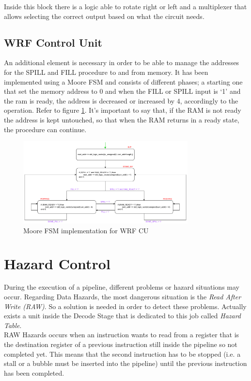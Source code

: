Inside this block there is a logic able to rotate right or left and a multiplexer that allows selecting the correct output based on what the circuit needs. 

\subsection{WRF Control Unit}

An additional element is necessary in order to be able to manage the addresses for the SPILL and FILL procedure to and from memory. It has been implemented using a Moore FSM and consists of different phases; a starting one that set the memory address to 0 and when the FILL or SPILL input is `1' and the ram is ready, the address is decreased or increased by 4, accordingly to the operation. Refer to figure \ref{wrf_cu}. It's important to say that, if the RAM is not ready the address is kept untouched, so that when the RAM returns in a ready state, the procedure can continue.


\begin{figure}[ht]
	\centering
	\includegraphics[width=0.8\textwidth]{chapters/4_DecodeStage/images/wRF_CU.pdf}
	\caption{Moore FSM implementation for WRF CU}
	\label{wrf_cu}
\end{figure}

\section{Hazard Control}

During the execution of a pipeline, different problems or hazard situations may occur. Regarding Data Hazards, the most dangerous situation is the \emph{Read After Write (RAW)}. So a solution is needed in order to detect these problems. Actually exists a unit inside the Decode Stage that is dedicated to this job called \emph{Hazard Table}.\\

RAW Hazards occurs when an instruction wants to read from a register that is the destination register of a previous instruction still inside the pipeline so not completed yet. This means that the second instruction has to be stopped (i.e. a stall or a bubble must be inserted into the pipeline) until the previous instruction has been completed.\\

